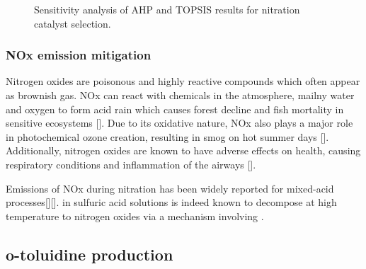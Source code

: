 \begin{figure}[h]
    \centering
    \qquad
    \caption{Sensitivity analysis of AHP and TOPSIS results for nitration catalyst selection.}%
    \label{fig:catalyst}%
\end{figure}

\subsubsection{NOx emission mitigation}

Nitrogen oxides are poisonous and highly reactive compounds which often appear as brownish gas. NOx can react with chemicals in the atmosphere, mailny water and oxygen to form acid rain which causes forest decline and fish mortality in sensitive ecosystems []. Due to its oxidative nature, NOx also plays a major role in photochemical ozone creation, resulting in smog on hot summer days []. Additionally, nitrogen oxides are known to have adverse effects on  health, causing respiratory conditions and  inflammation of the airways []. 

Emissions of NOx during nitration has been widely reported for mixed-acid processes\cite{}[][].  in sulfuric acid solutions is indeed known to decompose at high temperature to nitrogen oxides via a mechanism involving  \cite{robertson_kinetics_1955, kazakov_kinetics_1987}. 

\subsection{o-toluidine production}


